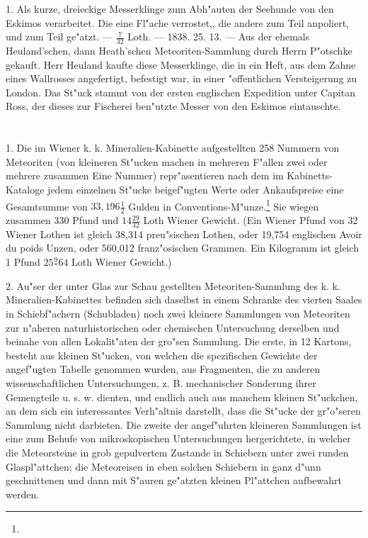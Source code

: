 \documentclass[a4paper, 11pt, oneside, polutonikogreek, german]{article}
\begin{document}
1. Als kurze, dreieckige Messerklinge zum Abh"auten der Seehunde von den Eskimos verarbeitet. Die eine Fl"ache verrostet,, die andere zum Teil anpoliert, und zum Teil ge"atzt. --- $\frac{7}{32}$ Loth. --- 1838. 25. 13. --- Aus der ehemals Heuland'schen, dann Heath'schen Meteoriten-Sammlung durch Herrn P"otschke gekauft. Herr Heuland kaufte diese Messerklinge, die in ein Heft, aus dem Zahne eines Wallrosses angefertigt, befestigt war, in einer "offentlichen Versteigerung zu London. Das St"uck stammt von der ersten englischen Expedition unter Capitan Ross, der dieses zur Fischerei ben"utzte Messer von den Eskimos eintauschte.
\clearpage
\section{}
\paragraph{}
1. Die im Wiener k. k. Mineralien-Kabinette aufgestellten 258 Nummern von Meteoriten (von kleineren St"ucken machen in mehreren F"allen zwei oder mehrere zusammen Eine Nummer) repr"asentieren nach dem im Kabinetts-Kataloge jedem einzelnen St"ucke beigef"ugten Werte oder Ankaufspreise eine Gesamtsumme von $33,196\frac{1}{2}$ Gulden in Conventions-M"unze.\footnote{} Sie wiegen zusammen 330 Pfund und $14\frac{29}{32}$ Loth Wiener Gewicht. (Ein Wiener Pfund von 32 Wiener Lothen ist gleich 38,314 preu"sischen Lothen, oder 19,754 englischen Avoir du poids Unzen, oder 560,012 franz"osischen Grammen. Ein Kilogramm ist gleich 1 Pfund $25\frac{9}{}64$ Loth Wiener Gewicht.)

2. Au"ser der unter Glas zur Schau gestellten Meteoriten-Sammlung des k. k. Mineralien-Kabinettes befinden sich daselbst in einem Schranke des vierten Saales in Schiebf"achern (Schubladen) noch zwei kleinere Sammlungen von Meteoriten zur n"aheren naturhistorischen oder chemischen Untersuchung derselben und beinahe von allen Lokalit"aten der gro"sen Sammlung. Die erste, in 12 Kartons, besteht aus kleinen St"ucken, von welchen die spezifischen Gewichte der angef"ugten Tabelle genommen wurden, aus Fragmenten, die zu anderen wissenschaftlichen Untersuchungen, z. B. mechanischer Sonderung ihrer Gemengteile u. s. w. dienten, und endlich auch aus manchem kleinen St"uckchen, an dem sich ein interessantes Verh"altnis darstellt, dass die St"ucke der gr"o"seren Sammlung nicht darbieten. Die zweite der angef"uhrten kleineren Sammlungen ist eine zum Behufe von mikroskopischen Untersuchungen hergerichtete, in welcher die Meteorsteine in grob gepulvertem Zustande in Schiebern unter zwei runden Glaspl"attchen; die Meteoreisen in eben solchen Schiebern in ganz d"unn geschnittenen und dann mit S"auren ge"atzten kleinen Pl"attchen aufbewahrt werden.
\end{document}
